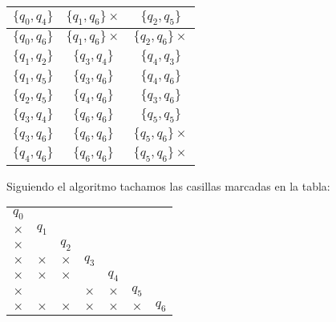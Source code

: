 \begin{itemize}
\begin{center}
\begin{tabular}{c||c|c}
            \hline
            $\{q_0,q_4\}$ & $\{q_1,q_6\}\times$ & $\{q_2,q_5\}$ \\
            \hline
            $\{q_0,q_6\}$ & $\{q_1,q_6\}\times$ & $\{q_2,q_6\}\times$ \\
            \hline
            $\{q_1,q_2\}$ & $\{q_3,q_4\}$ & $\{q_4,q_3\}$ \\
            \hline
            $\{q_1,q_5\}$ & $\{q_3,q_6\}$ & $\{q_4,q_6\}$ \\
            \hline
            $\{q_2,q_5\}$ & $\{q_4,q_6\}$ & $\{q_3,q_6\}$ \\
            \hline
            $\{q_3,q_4\}$ & $\{q_6,q_6\}$ & $\{q_5,q_5\}$\\
            \hline
            $\{q_3,q_6\}$ & $\{q_6,q_6\}$ & $\{q_5,q_6\}\times$\\
            \hline
            $\{q_4,q_6\}$ & $\{q_6,q_6\}$ & $\{q_5,q_6\}\times$\\
            \hline
            \end{tabular}
        \end{center}
        Siguiendo el algoritmo tachamos las casillas marcadas en la tabla:
        \begin{center}
            \begin{tabular}{ccccccc}
            $q_0$ \\ \cline{1-1}
            \multicolumn{1}{|c|}{$\times$} & $q_1$ \\
             \cline{1-2}
            \multicolumn{1}{|c|}{$\times$} & \multicolumn{1}{|c|}{} & $q_2$ \\ \cline{1-3}
            \multicolumn{1}{|c|}{$\times$} & \multicolumn{1}{|c|}{$\times$} & \multicolumn{1}{|c|}{$\times$} & $q_3$ \\
             \cline{1-4}
            \multicolumn{1}{|c|}{$\times$} & \multicolumn{1}{|c|}{$\times$} & \multicolumn{1}{|c|}{$\times$} & \multicolumn{1}{|c|}{} & $q_4$ \\ \cline{1-5}
            \multicolumn{1}{|c|}{$\times$} & \multicolumn{1}{|c|}{} & \multicolumn{1}{|c|}{} & \multicolumn{1}{|c|}{$\times$} & \multicolumn{1}{|c|}{$\times$} & $q_5$ \\
            \cline{1-6}
            \multicolumn{1}{|c|}{$\times$} & \multicolumn{1}{|c|}{$\times$} & \multicolumn{1}{|c|}{$\times$} & \multicolumn{1}{|c|}{$\times$} & \multicolumn{1}{|c|}{$\times$} & \multicolumn{1}{|c|}{$\times$} & $q_6$ \\
            \cline{1-6}   
            \end{tabular}

\end{center}
\end{itemize}
